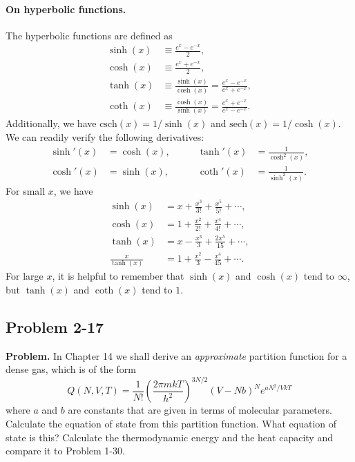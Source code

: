 \documentclass[twocolumn, 10pt]{article}
\numberwithin{equation}{section}
\newenvironment{problem}
{\par\medskip \color{problemblue}
  \textbf{Problem. }\ignorespaces}
{\medskip}
\begin{document}
\paragraph*{On hyperbolic functions.}

The hyperbolic functions are defined as
%
\begin{align*}
  \sinh(x) &\equiv \frac{ e^x - e^{-x} } { 2 }, \\
  \cosh(x) &\equiv \frac{ e^x + e^{-x} } { 2 }, \\
  \tanh(x) &\equiv \frac{ \sinh(x) } { \cosh(x)}  = \frac{ e^x - e^{-x} } { e^x + e^{-x} }, \\
  \coth(x) &\equiv \frac{ \cosh(x) } { \sinh(x) }  = \frac{ e^x + e^{-x} } { e^x - e^{-x} }.
\end{align*}
Additionally, we have
$\mathrm{csch}(x) = 1/\sinh(x)$ and
$\mathrm{sech}(x) = 1/\cosh(x)$.
%
We can readily verify the following derivatives:
\begin{align*}
  \sinh'(x) &= \cosh(x), &\qquad
  \tanh'(x) &= \frac{ 1 } { \cosh^2(x) }, \\
  \cosh'(x) &= \sinh(x), &\qquad
  \coth'(x) &= \frac{ 1 } { \sinh^2(x) }.
\end{align*}
%
For small $x$, we have
\begin{align*}
  \sinh(x) &= x + \frac{x^3}{3!} + \frac{x^5}{5!} + \cdots, \\
  \cosh(x) &= 1 + \frac{x^2}{2!} + \frac{x^4}{4!} + \cdots, \\
  \tanh(x) &= x - \frac{x^3}{3} + \frac{2x^5}{15} + \cdots, \\
  \frac{x}{\tanh(x)} &= 1 + \frac{x^2}{3} - \frac{x^4}{45} + \cdots.
\end{align*}
For large $x$, it is helpful to remember that
$\sinh(x)$ and $\cosh(x)$ tend to $\infty$,
but $\tanh(x)$ and $\coth(x)$ tend to $1$.


\subsection{Problem 2-17}

\begin{problem}
In Chapter 14 we shall derive an \emph{approximate}
partition function for a dense gas,
which is of the form
$$
  Q(N, V, T)
  =
  \frac{1}{N!}
  \left( \frac{ 2\pi m k T }{ h^2 } \right)^{3N/2}
  (V - N b)^N e^{a N^2/V k T}
$$
where $a$ and $b$ are constants that are given
in terms of molecular parameters.
%
Calculate the equation of state from this partition function.
%
What equation of state is this?
%
Calculate the thermodynamic energy and the heat capacity
and compare it to Problem 1-30.
\end{problem}
\end{document}
